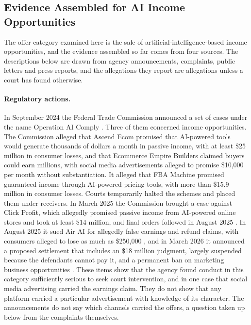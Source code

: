 \documentclass[12pt, a4paper]{article}
\begin{document}
\subsection{Evidence Assembled for AI Income Opportunities}
\label{sec:evidence}

The offer category examined here is the sale of artificial-intelligence-based income opportunities, and the evidence assembled so far comes from four sources. The descriptions below are drawn from agency announcements, complaints, public letters and press reports, and the allegations they report are allegations unless a court has found otherwise.

\paragraph{Regulatory actions.} In September 2024 the Federal Trade Commission announced a set of cases under the name Operation AI Comply \citep{FTC2024AIComply}. Three of them concerned income opportunities. The Commission alleged that Ascend Ecom promised that AI-powered tools would generate thousands of dollars a month in passive income, with at least \$25 million in consumer losses, and that Ecommerce Empire Builders claimed buyers could earn millions, with social media advertisements alleged to promise \$10,000 per month without substantiation. It alleged that FBA Machine promised guaranteed income through AI-powered pricing tools, with more than \$15.9 million in consumer losses. Courts temporarily halted the schemes and placed them under receivers. In March 2025 the Commission brought a case against Click Profit, which allegedly promised passive income from AI-powered online stores and took at least \$14 million, and final orders followed in August 2025 \citep{FTCClickProfit}. In August 2025 it sued Air AI for allegedly false earnings and refund claims, with consumers alleged to lose as much as \$250,000 \citep{FTC2025AirAI}, and in March 2026 it announced a proposed settlement that includes an \$18 million judgment, largely suspended because the defendants cannot pay it, and a permanent ban on marketing business opportunities \citep{FTC2026AirAI}. These items show that the agency found conduct in this category sufficiently serious to seek court intervention, and in one case that social media advertising carried the earnings claim. They do not show that any platform carried a particular advertisement with knowledge of its character. The announcements do not say which channels carried the offers, a question taken up below from the complaints themselves.
\end{document}
